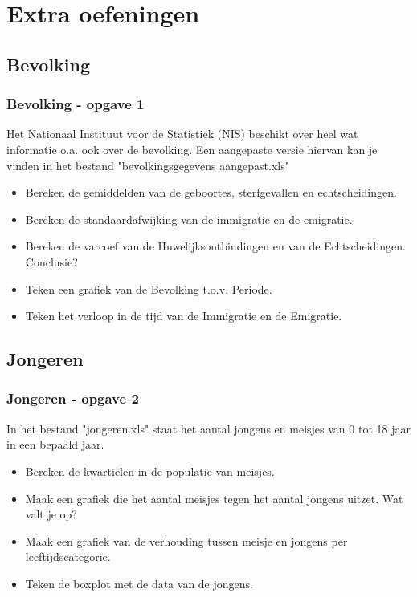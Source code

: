 \documentclass{beamer}
\newif\ifoplossing
\begin{document}
\section{Extra oefeningen}
\subsection{Bevolking}

\begin{frame}
	\frametitle{Bevolking - opgave 1}
	Het Nationaal Instituut voor de Statistiek (NIS) beschikt over heel wat informatie o.a. ook over de bevolking. Een aangepaste versie hiervan kan je vinden in het bestand "bevolkingsgegevens aangepast.xls"
	\begin{itemize}
		\item Bereken de gemiddelden van de geboortes, sterfgevallen en echtscheidingen.
		\item Bereken de standaardafwijking van de immigratie en de emigratie.
		\item Bereken de varcoef van de Huwelijksontbindingen en van de Echtscheidingen. Conclusie?
		\item Teken een grafiek van de Bevolking t.o.v. Periode.
		\item Teken het verloop in de tijd van de Immigratie en de Emigratie.
\end{itemize}
\end{frame}

\ifoplossing
\begin{frame}[fragile]
	
\end{frame}
	
\fi
\subsection{Jongeren}
\begin{frame}
	\frametitle{Jongeren - opgave 2}
	In het bestand "jongeren.xls" staat het aantal jongens en meisjes van 0 tot 18 jaar in een bepaald jaar.
		\begin{itemize}
			\item Bereken de kwartielen in de populatie van meisjes.
			\item Maak een grafiek die het aantal meisjes tegen het aantal jongens uitzet. Wat valt je op?
			\item Maak een grafiek van de verhouding tussen meisje en jongens per leeftijdscategorie.
			\item Teken de boxplot met de data van de jongens.
		\end{itemize}
\end{frame}
\end{document}
